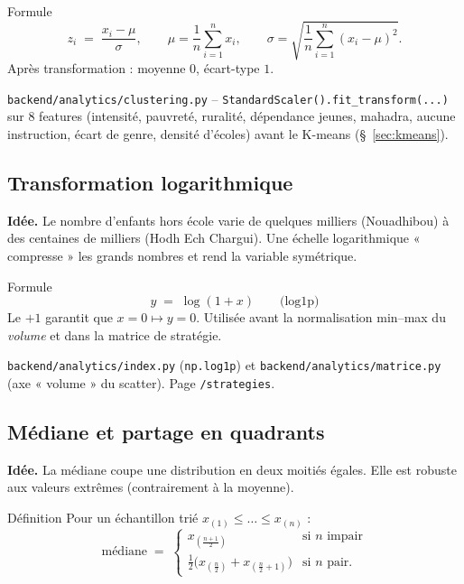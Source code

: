 \documentclass[11pt,a4paper]{article}
\newcommand{\txt}[1]{\texttt{#1}}
\begin{document}
\begin{meth}{Formule}
\[
z_i \;=\; \frac{x_i - \mu}{\sigma}, \qquad
\mu=\frac{1}{n}\sum_{i=1}^{n}x_i, \qquad
\sigma=\sqrt{\frac{1}{n}\sum_{i=1}^{n}(x_i-\mu)^2}.
\]
Après transformation : moyenne $0$, écart-type $1$.
\end{meth}

\begin{where}
\txt{backend/analytics/clustering.py} -- \txt{StandardScaler().fit\_transform(...)}
sur 8 features (intensité, pauvreté, ruralité, dépendance jeunes, mahadra,
aucune instruction, écart de genre, densité d'écoles) avant le K-means
(§~\ref{sec:kmeans}).
\end{where}

\subsection{Transformation logarithmique}
\label{sec:log}

\textbf{Idée.} Le nombre d'enfants hors école varie de quelques milliers
(Nouadhibou) à des centaines de milliers (Hodh Ech Chargui). Une échelle
logarithmique « compresse » les grands nombres et rend la variable symétrique.

\begin{meth}{Formule}
\[
y \;=\; \log(1+x) \qquad\text{(log1p)}
\]
Le $+1$ garantit que $x=0 \mapsto y=0$. Utilisée avant la normalisation
min--max du \emph{volume} et dans la matrice de stratégie.
\end{meth}

\begin{where}
\txt{backend/analytics/index.py} (\txt{np.log1p}) et
\txt{backend/analytics/matrice.py} (axe « volume » du scatter). Page
\txt{/strategies}.
\end{where}

\subsection{Médiane et partage en quadrants}
\label{sec:median}

\textbf{Idée.} La médiane coupe une distribution en deux moitiés égales. Elle
est robuste aux valeurs extrêmes (contrairement à la moyenne).

\begin{meth}{Définition}
Pour un échantillon trié $x_{(1)}\le\dots\le x_{(n)}$ :
\[
\text{médiane} \;=\;
\begin{cases}
x_{(\frac{n+1}{2})} & \text{si } n \text{ impair}\\[0.25em]
\frac{1}{2}\big(x_{(\frac{n}{2})}+x_{(\frac{n}{2}+1)}\big) & \text{si } n \text{ pair}.
\end{cases}
\]
\end{meth}
\end{document}
